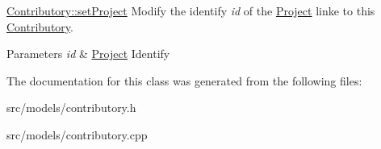 \hyperlink{classContributory_ab002e076bb131fab82e8a6a289b2d6ca}{Contributory\+::set\+Project} Modify the identify {\itshape id} of the \hyperlink{classProject}{Project} linke to this \hyperlink{classContributory}{Contributory}. 


\begin{DoxyParams}{Parameters}
{\em id} & \hyperlink{classProject}{Project} Identify \\
\hline
\end{DoxyParams}


The documentation for this class was generated from the following files\+:\begin{DoxyCompactItemize}
\item 
src/models/contributory.\+h\item 
src/models/contributory.\+cpp\end{DoxyCompactItemize}
